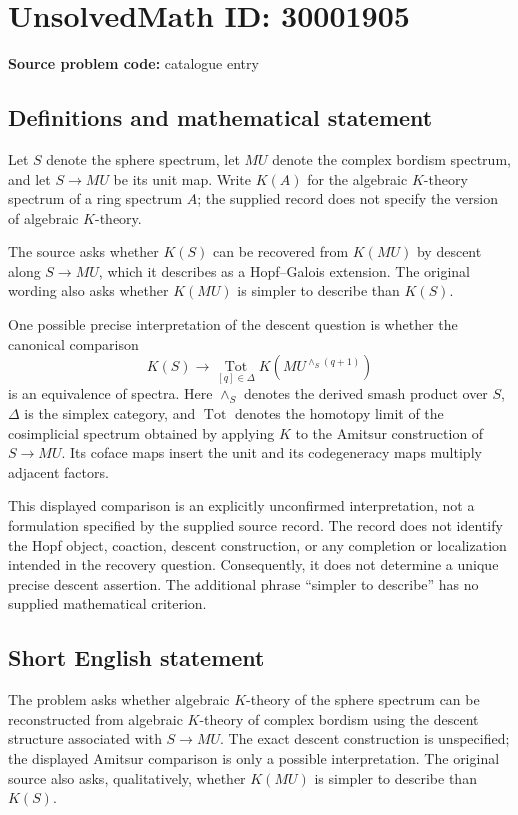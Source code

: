 \documentclass[11pt]{article}
\begin{document}
\section*{UnsolvedMath ID: 30001905}
\textbf{Source problem code:} catalogue entry
\subsection{Definitions and mathematical statement}
Let \(S\) denote the sphere spectrum, let \(MU\) denote the complex bordism spectrum, and let \(S\to MU\) be its unit map. Write \(K(A)\) for the algebraic \(K\)-theory spectrum of a ring spectrum \(A\); the supplied record does not specify the version of algebraic \(K\)-theory.

The source asks whether \(K(S)\) can be recovered from \(K(MU)\) by descent along \(S\to MU\), which it describes as a Hopf--Galois extension. The original wording also asks whether \(K(MU)\) is simpler to describe than \(K(S)\).

One possible precise interpretation of the descent question is whether the canonical comparison
\[
K(S)\longrightarrow
\operatorname*{Tot}_{[q]\in\Delta}
K\!\left(MU^{\wedge_S(q+1)}\right)
\]
is an equivalence of spectra. Here \(\wedge_S\) denotes the derived smash product over \(S\), \(\Delta\) is the simplex category, and \(\operatorname{Tot}\) denotes the homotopy limit of the cosimplicial spectrum obtained by applying \(K\) to the Amitsur construction of \(S\to MU\). Its coface maps insert the unit and its codegeneracy maps multiply adjacent factors.

This displayed comparison is an explicitly unconfirmed interpretation, not a formulation specified by the supplied source record. The record does not identify the Hopf object, coaction, descent construction, or any completion or localization intended in the recovery question. Consequently, it does not determine a unique precise descent assertion. The additional phrase ``simpler to describe'' has no supplied mathematical criterion.
\subsection{Short English statement}
The problem asks whether algebraic \(K\)-theory of the sphere spectrum can be reconstructed from algebraic \(K\)-theory of complex bordism using the descent structure associated with \(S\to MU\). The exact descent construction is unspecified; the displayed Amitsur comparison is only a possible interpretation. The original source also asks, qualitatively, whether \(K(MU)\) is simpler to describe than \(K(S)\).
\end{document}
